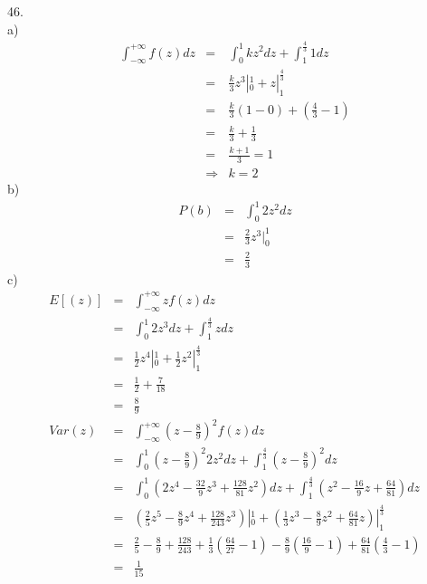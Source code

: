 \documentclass[12pt]{article}
\begin{document}
46. \\
a)
\begin{eqnarray*}
  \int_{-\infty}^{+\infty} f(z) dz
  &=& \int_{0}^{1} kz^2 dz + \int_{1}^{\frac {4}{3}} 1 dz \\
  &=& \frac {k}{3} z^3|_0^1 + z|_1^{\frac {4}{3}} \\
  &=& \frac {k}{3} (1 - 0) + (\frac {4}{3} - 1) \\
  &=& \frac {k}{3} + \frac{1}{3} \\
  &=& \frac {k+1}{3} = 1 \\
  &\Longrightarrow& k = 2
\end{eqnarray*}
b)
\begin{eqnarray*}
  P(b)
  &=&\int_{0}^{1} 2 z^2 dz \\
  &=& \frac {2}{3} z^3|_0^1 \\
  &=& \frac {2}{3}
\end{eqnarray*}
c)
\begin{eqnarray*}
  E[(z)]
  &=& \int_{-\infty}^{+\infty} zf(z) dz \\
  &=& \int_{0}^{1} 2z^3 dz + \int_{1}^{\frac {4}{3}} z dz \\
  &=& \frac {1}{2} z^4|_0^1 + \frac {1}{2} z^2|_1^{\frac {4}{3}} \\
  &=& \frac {1}{2} + \frac {7}{18} \\
  &=& \frac {8}{9} \\
  Var(z)
  &=& \int_{-\infty}^{+\infty} (z - \frac {8}{9})^2 f(z) dz \\
  &=& \int_{0}^{1} (z - \frac {8}{9})^2 2z^2 dz
  + \int_{1}^{\frac {4}{3}} (z - \frac {8}{9})^2 dz \\
  &=& \int_{0}^{1} (2 z^4 - \frac {32}{9} z^3 + \frac {128}{81} z^2) dz
  + \int_{1}^{\frac {4}{3}} (z^2 - \frac {16}{9} z + \frac {64}{81}) dz \\
  &=& (\frac {2}{5} z^5 - \frac {8}{9} z^4 + \frac {128}{243} z^3)|_0^1
  + (\frac{1}{3} z^3 - \frac{8}{9} z^2 + \frac{64}{81} z)|_1^{\frac {4}{3}} \\
  &=& \frac {2}{5} - \frac {8}{9} + \frac {128}{243}
  + \frac {1}{3} (\frac{64}{27} - 1) - \frac{8}{9}(\frac{16}{9} - 1)
  + \frac{64}{81} (\frac {4}{3} - 1) \\
  &=& \frac {1}{15}
\end{eqnarray*}
\end{document}

